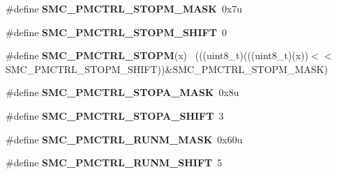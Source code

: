 \begin{DoxyCompactItemize}
\item 
\hypertarget{group___s_m_c___register___masks_ga8df79d8a16a6d12e3b343eec59d9453c}{}\#define {\bfseries S\+M\+C\+\_\+\+P\+M\+C\+T\+R\+L\+\_\+\+S\+T\+O\+P\+M\+\_\+\+M\+A\+S\+K}~0x7u\label{group___s_m_c___register___masks_ga8df79d8a16a6d12e3b343eec59d9453c}

\item 
\hypertarget{group___s_m_c___register___masks_gaac7423086f31a8fbbfc8d18b1a876f26}{}\#define {\bfseries S\+M\+C\+\_\+\+P\+M\+C\+T\+R\+L\+\_\+\+S\+T\+O\+P\+M\+\_\+\+S\+H\+I\+F\+T}~0\label{group___s_m_c___register___masks_gaac7423086f31a8fbbfc8d18b1a876f26}

\item 
\hypertarget{group___s_m_c___register___masks_gac786585532e3edd7f48def55c208ef12}{}\#define {\bfseries S\+M\+C\+\_\+\+P\+M\+C\+T\+R\+L\+\_\+\+S\+T\+O\+P\+M}(x)                                        ~(((uint8\+\_\+t)(((uint8\+\_\+t)(x))$<$$<$S\+M\+C\+\_\+\+P\+M\+C\+T\+R\+L\+\_\+\+S\+T\+O\+P\+M\+\_\+\+S\+H\+I\+F\+T))\&S\+M\+C\+\_\+\+P\+M\+C\+T\+R\+L\+\_\+\+S\+T\+O\+P\+M\+\_\+\+M\+A\+S\+K)\label{group___s_m_c___register___masks_gac786585532e3edd7f48def55c208ef12}

\item 
\hypertarget{group___s_m_c___register___masks_gadd72ad662b62a7b51225b529fef2c77a}{}\#define {\bfseries S\+M\+C\+\_\+\+P\+M\+C\+T\+R\+L\+\_\+\+S\+T\+O\+P\+A\+\_\+\+M\+A\+S\+K}~0x8u\label{group___s_m_c___register___masks_gadd72ad662b62a7b51225b529fef2c77a}

\item 
\hypertarget{group___s_m_c___register___masks_gadfe89210f121f10b74f2fba55f059e1d}{}\#define {\bfseries S\+M\+C\+\_\+\+P\+M\+C\+T\+R\+L\+\_\+\+S\+T\+O\+P\+A\+\_\+\+S\+H\+I\+F\+T}~3\label{group___s_m_c___register___masks_gadfe89210f121f10b74f2fba55f059e1d}

\item 
\hypertarget{group___s_m_c___register___masks_ga1a456925e291d6d53f4891b25fcaf8eb}{}\#define {\bfseries S\+M\+C\+\_\+\+P\+M\+C\+T\+R\+L\+\_\+\+R\+U\+N\+M\+\_\+\+M\+A\+S\+K}~0x60u\label{group___s_m_c___register___masks_ga1a456925e291d6d53f4891b25fcaf8eb}

\item 
\hypertarget{group___s_m_c___register___masks_ga8f8dc472f4a4b6ad1babae518c44d55e}{}\#define {\bfseries S\+M\+C\+\_\+\+P\+M\+C\+T\+R\+L\+\_\+\+R\+U\+N\+M\+\_\+\+S\+H\+I\+F\+T}~5\label{group___s_m_c___register___masks_ga8f8dc472f4a4b6ad1babae518c44d55e}


\end{DoxyCompactItemize}
